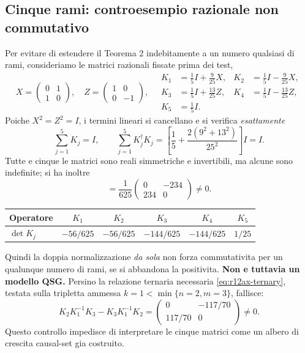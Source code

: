 \documentclass[11pt,a4paper]{article}
\begin{document}
\subsection{Cinque rami: controesempio razionale non commutativo}
Per evitare di estendere il Teorema 2 indebitamente a un numero qualsiasi di rami, consideriamo le matrici razionali fissate prima dei test,
\begin{equation}
 X=\begin{pmatrix}0&1\\1&0\end{pmatrix},\quad
 Z=\begin{pmatrix}1&0\\0&-1\end{pmatrix},\quad
 \begin{aligned}
 K_1&=\tfrac15I+\tfrac9{25}X,&K_2&=\tfrac15I-\tfrac9{25}X,\\
 K_3&=\tfrac15I+\tfrac{13}{25}Z,&K_4&=\tfrac15I-\tfrac{13}{25}Z,\\
 K_5&=\tfrac15I.&&
 \end{aligned}
 \label{eq:r12ay-five}
\end{equation}
Poiche $X^2=Z^2=I$, i termini lineari si cancellano e si verifica \emph{esattamente}
\begin{equation}
 \sum_{j=1}^5K_j=I,\qquad
 \sum_{j=1}^5K_j^\dagger K_j
 =\left[\frac15+\frac{2(9^2+13^2)}{25^2}\right]I=I.
 \label{eq:r12ay-five-rules}
\end{equation}
Tutte e cinque le matrici sono reali simmetriche e invertibili, ma alcune sono indefinite; si ha inoltre
\begin{equation}
 [K_1,K_3]=\frac1{625}\begin{pmatrix}0&-234\\234&0\end{pmatrix}\ne0.
 \label{eq:r12ay-comm}
\end{equation}
\begin{center}
\begin{tabular}{lccccc}
\toprule
Operatore & $K_1$ & $K_2$ & $K_3$ & $K_4$ & $K_5$\\
\midrule
$\det K_j$ & $-56/625$ & $-56/625$ & $-144/625$ & $-144/625$ & $1/25$\\
\bottomrule
\end{tabular}
\end{center}
Quindi la doppia normalizzazione \emph{da sola} non forza commutativita per un qualunque numero di rami, se si abbandona la positivita. \textbf{Non e tuttavia un modello QSG.} Persino la relazione ternaria necessaria \eqref{eq:r12ax-ternary}, testata sulla tripletta ammessa $k=1<\min\{n=2,m=3\}$, fallisce:
\begin{equation}
 K_2K_1^{-1}K_3-K_3K_1^{-1}K_2
 =\begin{pmatrix}0&-117/70\\117/70&0\end{pmatrix}\ne0.
 \label{eq:r12ay-qbc-fail}
\end{equation}
Questo controllo impedisce di interpretare le cinque matrici come un albero di crescita causal-set gia costruito.
\end{document}
